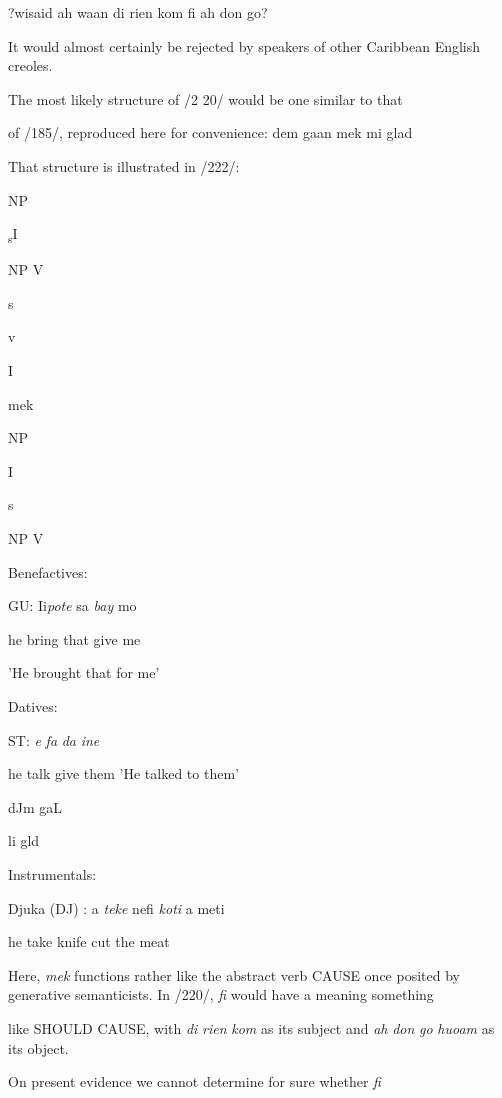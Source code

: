 \ea\label{ex:221}
 ?wisaid ah waan di rien kom fi ah don go?
\glt
\z

It would almost certainly be rejected by speakers of other Caribbean English creoles.

The most likely structure of /2 20/ would be one similar to that

of /185/, reproduced here for convenience: dem gaan mek mi glad

That structure is illustrated in /222/:



\ea\label{ex:222}

\glt
\z

NP

\textsubscript{s}I

NP V

s 

v

I

mek

NP

I

s

NP V

\ea\label{ex:224}
 Benefactives:
\glt
\z

GU: Ii\textit{pote} sa \textit{bay} mo

he bring that give me

'He brought that for me'

\ea\label{ex:225}
 Datives:
\glt
\z

ST: \textit{e} \textit{fa} \textit{da} \textit{ine}

he talk give them 'He talked to them'

dJm gaL

li gld

\ea\label{ex:226}
 Instrumentals:
\glt
\z

Djuka (DJ) : a \textit{teke} nefi \textit{koti} a meti

he take knife cut the meat

Here, \textit{mek} functions rather like the abstract verb CAUSE once posited by generative semanticists. In /220/, \textit{fi} would have a meaning something

like SHOULD CAUSE, with \textit{di} \textit{rien} \textit{k}\textit{om} as its subject and \textit{ah} \textit{don} \textit{go} \textit{huoam} as its object.

On present evidence we cannot determine for sure whether \textit{fi}

